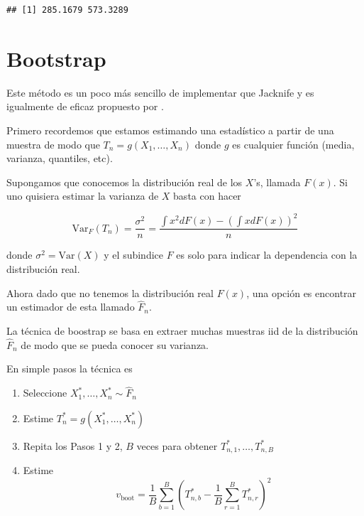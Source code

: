 \documentclass[
  12pt,
]{book}
\providecommand{\tightlist}{%
  \setlength{\itemsep}{0pt}\setlength{\parskip}{0pt}}
\theoremstyle{definition}
\theoremstyle{definition}
\theoremstyle{definition}
\theoremstyle{remark}
\begin{document}
\begin{verbatim}
## [1] 285.1679 573.3289
\end{verbatim}

\hypertarget{bootstrap}{%
\section{Bootstrap}\label{bootstrap}}

Este método es un poco más sencillo de implementar que Jacknife y es
igualmente de eficaz propuesto por \cite{Efron1979}.

Primero recordemos que estamos estimando una estadístico a partir de
una muestra de modo que \(T_{n}=g\left( X_{1},\ldots,X_{n} \right)\)
donde \(g\) es cualquier función (media, varianza, quantiles, etc).

Supongamos que conocemos la distribución real de los \(X\)'s, llamada \(F(x)\). Si uno
quisiera estimar la varianza de \(X\) basta con hacer

\begin{equation*}
\mathrm{Var}_{F}\left(T_{n}\right)
= \frac{\sigma^{2}}{n}=\frac{\int x^{2}  dF(x)-\left(\int x
dF(x)\right)^{2}}{n}
\end{equation*}

donde \(\sigma^{2} = \mathrm{Var}\left(X\right)\) y el subindice \(F\) es solo para indicar la dependencia con la distribución real.

Ahora dado que no tenemos la distribución real \(F(x)\), una opción es encontrar un estimador de esta llamado \(\hat{F}_n\).

La técnica de boostrap se basa en extraer muchas muestras iid de la distribución \(\hat{F}_n\) de modo que se pueda conocer su varianza.

En simple pasos la técnica es

\begin{enumerate}
\def\labelenumi{\arabic{enumi}.}
\tightlist
\item
  Seleccione \(X_{1}^{*}, \ldots, X_{n}^{*} \sim \widehat{F}_{n}\)
\item
  Estime \(T_{n}^{*}=g\left(X_{1}^{*}, \ldots, X_{n}^{*}\right)\)
\item
  Repita los Pasos 1 y 2, \(B\) veces para obtener \(T_{n, 1}^{*}, \ldots, T_{n, B}^{*}\)
\item
  Estime
  \[
  v_{\mathrm{boot}}=\frac{1}{B} \sum_{b=1}^{B}\left(T_{n, b}^{*}-\frac{1}{B} \sum_{r=1}^{B} T_{n, r}^{*}\right)^{2}
  \]
\end{enumerate}
\end{document}
